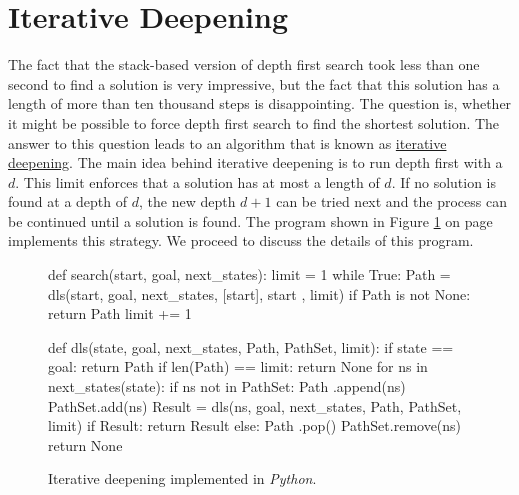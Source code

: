 \section{Iterative Deepening}
The fact that the stack-based version of depth first search took less than one second to find a solution is very
impressive, but the fact that this solution has a length of more than ten thousand steps is disappointing.
The question is, whether it might be possible to force depth first search to find the shortest
solution.  The answer to this question leads to an algorithm that is known as
\href{https://en.wikipedia.org/wiki/Iterative_deepening_depth-first_search}{iterative deepening}.
 The main idea behind iterative deepening is to run depth first with a  $d$.  This limit enforces that a solution has at most a length of $d$.  If no solution is found at a
depth of $d$, the new depth $d+1$ can be tried next and the process can be continued until a solution is found.
The program shown in Figure \ref{fig:Iterative-Deepening.ipynb} on page \pageref{fig:Iterative-Deepening.ipynb}
implements this strategy.  We proceed to discuss the details of this program.

\begin{figure}[!ht]
\centering
\begin{python3code}
    def search(start, goal, next_states):
        limit = 1
        while True:
            Path = dls(start, goal, next_states, [start], { start }, limit)
            if Path is not None:
                return Path
            limit += 1
    
    def dls(state, goal, next_states, Path, PathSet, limit):
        if state == goal:
            return Path
        if len(Path) == limit:
            return None
        for ns in next_states(state):
            if ns not in PathSet:
                Path   .append(ns)
                PathSet.add(ns)
                Result = dls(ns, goal, next_states, Path, PathSet, limit)
                if Result:
                    return Result
                else:
                    Path   .pop()
                    PathSet.remove(ns)
        return None
\end{python3code}
\vspace*{-0.3cm}
\caption{Iterative deepening implemented in \textsl{Python}.}
\label{fig:Iterative-Deepening.ipynb}
\end{figure}

